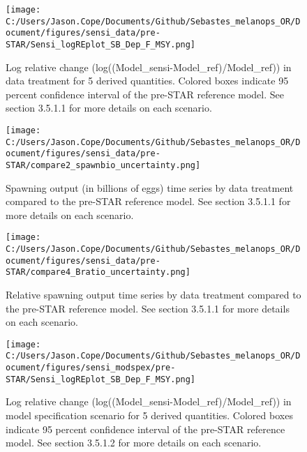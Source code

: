 \documentclass[11pt,
  letterpaper,
]{article}
\begin{document}
\newpage

\begin{figure}
{\centering
\texttt{[image: C:/Users/Jason.Cope/Documents/Github/Sebastes\_melanops\_OR/Document/figures/sensi\_data/pre-STAR/Sensi\_logREplot\_SB\_Dep\_F\_MSY.png]}
}
\caption{Log relative change (log((Model\_sensi-Model\_ref)/Model\_ref)) in data treatment for 5 derived quantities. Colored boxes indicate 95 percent confidence interval of the pre-STAR reference model. See section 3.5.1.1 for more details on each scenario.\label{fig:sensi-data-RE_preSTAR}}
\end{figure}

\newpage

\begin{figure}
{\centering
\texttt{[image: C:/Users/Jason.Cope/Documents/Github/Sebastes\_melanops\_OR/Document/figures/sensi\_data/pre-STAR/compare2\_spawnbio\_uncertainty.png]}
}
\caption{Spawning output (in billions of eggs) time series by data treatment compared to the pre-STAR reference model. See section 3.5.1.1 for more details on each scenario.\label{fig:sensi-data-ssb_preSTAR}}
\end{figure}

\newpage

\begin{figure}
{\centering
\texttt{[image: C:/Users/Jason.Cope/Documents/Github/Sebastes\_melanops\_OR/Document/figures/sensi\_data/pre-STAR/compare4\_Bratio\_uncertainty.png]}
}
\caption{Relative spawning output time series by data treatment compared to the pre-STAR reference model. See section 3.5.1.1 for more details on each scenario.\label{fig:sensi-data-depl_preSTAR}}
\end{figure}

\newpage

\begin{figure}
{\centering
\texttt{[image: C:/Users/Jason.Cope/Documents/Github/Sebastes\_melanops\_OR/Document/figures/sensi\_modspex/pre-STAR/Sensi\_logREplot\_SB\_Dep\_F\_MSY.png]}
}
\caption{Log relative change (log((Model\_sensi-Model\_ref)/Model\_ref)) in model specification scenario for 5 derived quantities. Colored boxes indicate 95 percent confidence interval of the pre-STAR reference model. See section 3.5.1.2 for more details on each scenario.\label{fig:sensi-modspec-RE_preSTAR}}
\end{figure}
\end{document}
